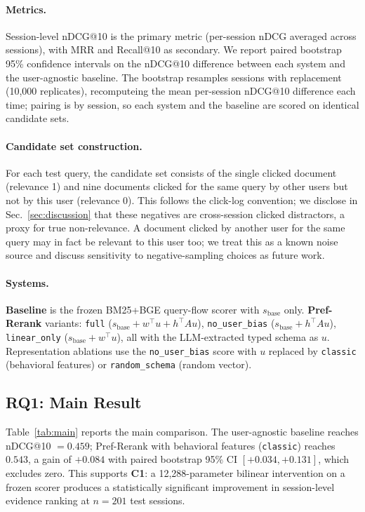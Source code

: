 \paragraph{Metrics.}
Session-level nDCG@10 is the primary metric (per-session nDCG averaged across sessions), with MRR and Recall@10 as secondary. We report paired bootstrap 95\% confidence intervals on the nDCG@10 difference between each system and the user-agnostic baseline. The bootstrap resamples sessions with replacement (10{,}000 replicates), recomputeing the mean per-session nDCG@10 difference each time; pairing is by session, so each system and the baseline are scored on identical candidate sets.

\paragraph{Candidate set construction.}
For each test query, the candidate set consists of the single clicked document (relevance 1) and nine documents clicked for the same query by other users but not by this user (relevance 0). This follows the click-log convention; we disclose in Sec.~\ref{sec:discussion} that these negatives are cross-session clicked distractors, a proxy for true non-relevance. A document clicked by another user for the same query may in fact be relevant to this user too; we treat this as a known noise source and discuss sensitivity to negative-sampling choices as future work.

\paragraph{Systems.}
\textbf{Baseline} is the frozen BM25+BGE query-flow scorer with $s_{\mathrm{base}}$ only. \textbf{Pref-Rerank} variants: \texttt{full} ($s_{\mathrm{base}} + w^\top u + h^\top A u$), \texttt{no\_user\_bias} ($s_{\mathrm{base}} + h^\top A u$), \texttt{linear\_only} ($s_{\mathrm{base}} + w^\top u$), all with the LLM-extracted typed schema as $u$. Representation ablations use the \texttt{no\_user\_bias} score with $u$ replaced by \texttt{classic} (behavioral features) or \texttt{random\_schema} (random vector).

\subsection{RQ1: Main Result}
\label{sec:exp:main}

Table~\ref{tab:main} reports the main comparison. The user-agnostic baseline reaches nDCG@10 $= 0.459$; Pref-Rerank with behavioral features (\texttt{classic}) reaches $0.543$, a gain of $+0.084$ with paired bootstrap 95\% CI $[+0.034, +0.131]$, which excludes zero. This supports \textbf{C1}: a 12{,}288-parameter bilinear intervention on a frozen scorer produces a statistically significant improvement in session-level evidence ranking at $n{=}201$ test sessions.

